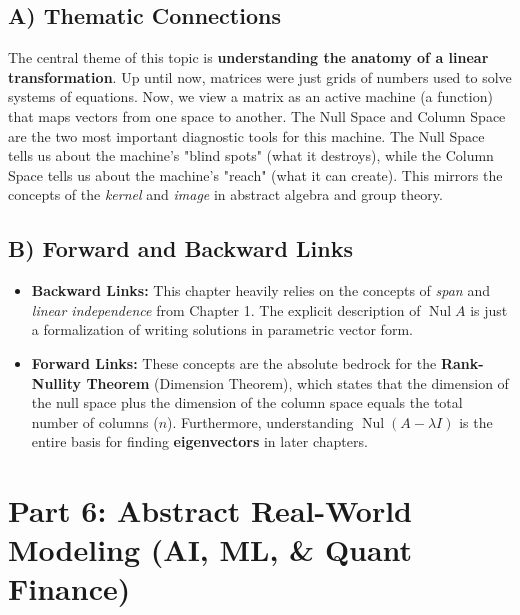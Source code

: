 \documentclass[11pt]{article}
\begin{document}
\subsection{A) Thematic Connections}
The central theme of this topic is \textbf{understanding the anatomy of a linear transformation}. Up until now, matrices were just grids of numbers used to solve systems of equations. Now, we view a matrix as an active machine (a function) that maps vectors from one space to another. 
The Null Space and Column Space are the two most important diagnostic tools for this machine. The Null Space tells us about the machine's "blind spots" (what it destroys), while the Column Space tells us about the machine's "reach" (what it can create). This mirrors the concepts of the \textit{kernel} and \textit{image} in abstract algebra and group theory.

\subsection{B) Forward and Backward Links}
\begin{itemize}
    \item \textbf{Backward Links:} This chapter heavily relies on the concepts of \textit{span} and \textit{linear independence} from Chapter 1. The explicit description of $\operatorname{Nul} A$ is just a formalization of writing solutions in parametric vector form.
    \item \textbf{Forward Links:} These concepts are the absolute bedrock for the \textbf{Rank-Nullity Theorem} (Dimension Theorem), which states that the dimension of the null space plus the dimension of the column space equals the total number of columns ($n$). Furthermore, understanding $\operatorname{Nul}(A - \lambda I)$ is the entire basis for finding \textbf{eigenvectors} in later chapters.
\end{itemize}

\newpage

\section{Part 6: Abstract Real-World Modeling (AI, ML, \& Quant Finance)}
\end{document}
